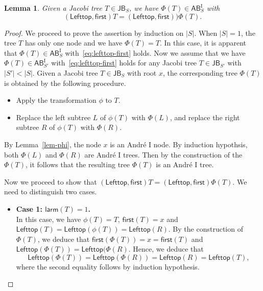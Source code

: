 \documentclass[12pt]{article}
\numberwithin{equation}{section}
\theoremstyle{plain}
\newtheorem{lemma}[theorem]{Lemma}
\def\larm{\mathsf{larm}}
\def\AB{\mathsf{AB}}
\def\JB{\mathsf{JB}}
\def\first{\mathsf{first}}
\def\Lefttop{\mathsf{Lefttop}}
\begin{document}
   		
   		
   		\begin{lemma}\label{lem-Phi}
   			Given a Jacobi tree $T\in \JB_S$,  we have $\Phi(T)\in \AB^{\mathrm{I}}_{S}$  with
   			\begin{equation}\label{eq:lefttop-first}
   		(\Lefttop,   \first)T=(\Lefttop,   \first))\Phi(T).
   			\end{equation}
   			\end{lemma}
   		\begin{proof}
   			We proceed to prove the assertion by induction on $|S|$.  When $|S|=1$, the tree $T$ has only one node and  we have $\Phi(T)=T$. In this case,  it is apparent that $\Phi(T)\in \AB^{\mathrm{I}}_{S}$  with~\eqref{eq:lefttop-first} holds. Now we assume that  we have $\Phi(T)\in \AB^{\mathrm{I}}_{S'}$  with~\eqref{eq:lefttop-first} holds   for any Jacobi tree $T\in \JB_{S'}$ with $|S'|<|S|$. 
   			Given a Jacobi tree $T\in \JB_{S}$ with root $x$,   the corresponding tree $\Phi(T)$ is obtained by the following procedure.
   			\begin{itemize}
   				\item Apply the transformation $\phi$ to $T$.
   				\item Replace the left subtree $L$ of $\phi(T)$ with $\Phi(L)$, and replace the right subtree $R$ of $\phi(T)$ with $\Phi(R)$. 
   				\end{itemize}
   			 By Lemma~\ref{lem-phi}, the node $x$ is an Andr\'e $\mathrm{I}$ node. By induction hypothsis, both $\Phi(L)$ and $\Phi(R)$ are Andr\'e $\mathrm{I}$ trees. Then by the construction of the $\Phi(T)$,  it follows that the resulting tree $\Phi(T)$ is an Andr\'e $\mathrm{I}$ tree.
   				
   				Now we proceed to show that $(\Lefttop, \first)T= (\Lefttop, \first)\Phi(T)$.  We need to distinguish  two cases.
   				\begin{itemize}
				\item {\bf Case 1: $\larm(T)=1$.} \\
   				In this case, we have $\phi(T)=T$, $\first(T)=x$ and 
   				$\Lefttop(T)=\Lefttop(\phi(T))=\Lefttop(R)$.  By the construction of $\Phi(T)$, we deduce that
   				$\first(\Phi(T))=x=\first(T)$ and $\Lefttop(\Phi(T))=\Lefttop(\Phi(R)$. Hence, we deduce that  
   				$$
   				\Lefttop(\Phi(T))=\Lefttop(\Phi(R))=\Lefttop(R)=\Lefttop(T),
   				$$
   				where the second equality follows by induction hypothesis.
   				

\end{itemize}
\end{proof}
\end{document}
